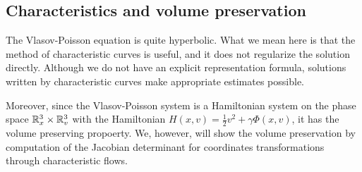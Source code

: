 \documentclass{article}
\begin{document}
\subsection{Characteristics and volume preservation}

The Vlasov-Poisson equation is quite hyperbolic.
What we mean here is that the method of characteristic curves is useful, and it does not regularize the solution directly.
Although we do not have an explicit representation formula, solutions written by characteristic curves make appropriate estimates possible.

Moreover, since the Vlasov-Poisson system is a Hamiltonian system on the phase space $\mathbb{R}_x^3\times\mathbb{R}_v^3$ with the Hamiltonian $H(x,v)=\frac12v^2+\gamma\Phi(x,v)$, it has the volume preserving propoerty.
We, however, will show the volume preservation by computation of the Jacobian determinant for coordinates transformations through characteristic flows.
\end{document}
